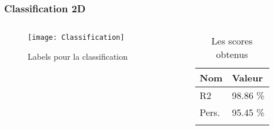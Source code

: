 
\begin{frame}
    \frametitle{Classification 2D}
    \begin{columns}
        \begin{column}{0.7\textwidth}
            \begin{figure}
            \texttt{[image: Classification]}       
            \caption{Labels pour la classification}
            \end{figure}
         \end{column}
         \pause
         \begin{column}{0.3\textwidth}
            \begin{table}[h!]
                \caption{Les scores obtenus}
                \centering
                \begin{tabular}{l l}
                \toprule
                \textbf{Nom} & \textbf{Valeur} \\
                \midrule
                R2 & 98.86 \%\\
                Pers. & 95.45 \%\\
                \bottomrule\\
                \end{tabular}
            \end{table}
         \end{column}
    \end{columns}
\end{frame}


% 

